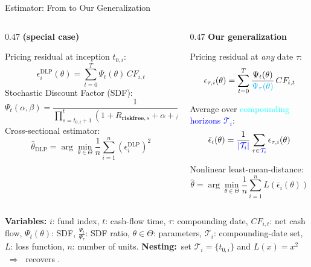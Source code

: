 \documentclass[aspectratio=169,11pt]{beamer}
\begin{document}
\begin{frame}[t]{Estimator: From \cite{DLP12} to Our Generalization}
\small
\begin{columns}[T]
\begin{column}{0.47\textwidth}
\textbf{\cite{DLP12} (special case)}

\medskip
Pricing residual at inception $t_{0,i}$:
\[
\epsilon_i^{\text{DLP}}(\theta)=\sum_{t=0}^T \Psi_{t}(\theta)\,CF_{i,t}
\]
Stochastic Discount Factor (SDF):
{\tiny
\[
\Psi_{t}(\alpha, \beta) =
\frac{1}{
	\prod_{s=t_{0,i}+1}^{t}
	\left( 
	1 + R_{\textbf{riskfree}, s} + \alpha + \beta R_{\textbf{MKT}, s}
	\right)
} 
\]
}
Cross-sectional estimator:
\[
\hat\theta_{\text{DLP}}=\arg\min_{\theta\in\Theta}\frac{1}{n}\sum_{i=1}^n\!\left(\epsilon_i^{\text{DLP}}\right)^2
\]

\end{column}
\hfill
\vrule{}
\hfill
\begin{column}{0.47\textwidth}
\textbf{Our generalization}

\medskip
Pricing residual at \emph{any} date $\tau$:
\[
\epsilon_{\tau,i}(\theta)=\sum_{t=0}^T \frac{\Psi_{t}(\theta)}{\textcolor{cyan}{\Psi_{\tau}(\theta)} }\,CF_{i,t}
\]

Average over \textcolor{cyan}{compounding} \textcolor{blue}{horizons $\mathcal{T}_i$}:
\[
\bar\epsilon_i(\theta)=\frac{1}{\textcolor{blue}{ |\mathcal{T}_i|}}\sum_{\tau \in \textcolor{blue}{\mathcal{T}_i}}\epsilon_{\tau,i}(\theta)
\]

Nonlinear least-mean-distance:
\[
\hat\theta=\arg\min_{\theta\in\Theta}\frac{1}{n}\sum_{i=1}^n L\!\left(\bar\epsilon_i(\theta)\right)
\]


\end{column}
\end{columns}

\vspace{0.3em}
{\tiny \textbf{Variables:} $i$: fund index, $t$: cash-flow time, $\tau$: compounding date, $CF_{i,t}$: net cash flow, $\Psi_t(\theta)$: SDF, $\frac{\Psi_t}{\Psi_\tau}$: SDF ratio, $\theta\!\in\!\Theta$: parameters, $\mathcal{T}_i$: compounding-date set, $L$: loss function, $n$: number of units. \textbf{Nesting:}\ set $\mathcal{T}_i=\{t_{0,i}\}$ and $L(x)=x^2$ $\;\Longrightarrow\;$ recovers \cite{DLP12}.}

\end{frame}
\end{document}
